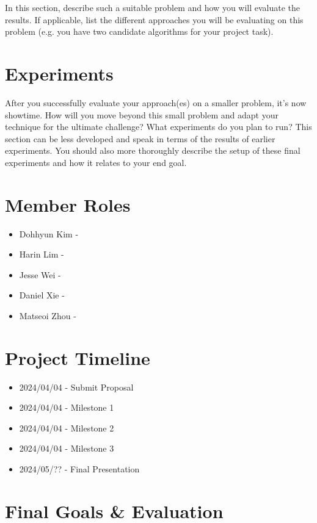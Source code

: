 \documentclass{article}
\begin{document}
In this section, describe such a suitable problem and how you will evaluate the results. If applicable, list the different approaches you will be evaluating on this problem (e.g. you have two candidate algorithms for your project task).

\section{Experiments}

After you successfully evaluate your approach(es) on a smaller problem, it's now showtime. How will you move beyond this small problem and adapt your technique for the ultimate challenge? What experiments do you plan to run? This section can be less developed and speak in terms of the results of earlier experiments. You should also more thoroughly describe the setup of these final experiments and how it relates to your end goal.

\section{Member Roles}

\begin{itemize}
\item Dohhyun Kim - 
\item Harin Lim - 
\item Jesse Wei - 
\item Daniel Xie - 
\item Matseoi Zhou - 
\end{itemize}


\section{Project Timeline}

\begin{itemize}
\item 2024/04/04 - Submit Proposal 
\item 2024/04/04 - Milestone 1 
\item 2024/04/04 - Milestone 2  
\item 2024/04/04 - Milestone 3  
\item 2024/05/?? - Final Presentation 
\end{itemize}
\section{Final Goals \& Evaluation}
\end{document}
